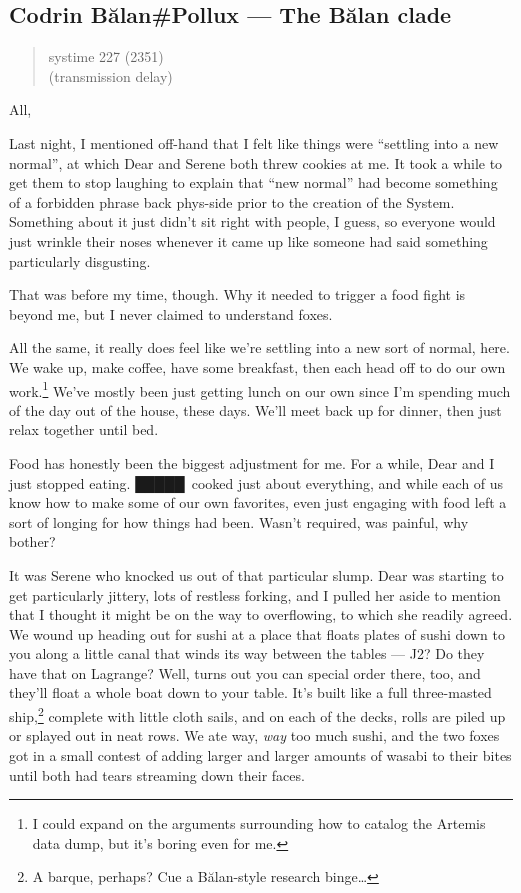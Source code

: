 \hypertarget{codrin-bux103lanpollux-the-bux103lan-clade}{%
\subsection{Codrin Bălan\#Pollux — The Bălan clade}\label{codrin-bux103lanpollux-the-bux103lan-clade}}

\begin{quote}
systime 227 (2351)\\
(transmission delay)
\end{quote}

All,

Last night, I mentioned off-hand that I felt like things were ``settling into a new normal'', at which Dear and Serene both threw cookies at me. It took a while to get them to stop laughing to explain that ``new normal'' had become something of a forbidden phrase back phys-side prior to the creation of the System. Something about it just didn't sit right with people, I guess, so everyone would just wrinkle their noses whenever it came up like someone had said something particularly disgusting.

That was before my time, though. Why it needed to trigger a food fight is beyond me, but I never claimed to understand foxes.

All the same, it really does feel like we're settling into a new sort of normal, here. We wake up, make coffee, have some breakfast, then each head off to do our own work.\footnote{I could expand on the arguments surrounding how to catalog the Artemis data dump, but it's boring even for me.} We've mostly been just getting lunch on our own since I'm spending much of the day out of the house, these days. We'll meet back up for dinner, then just relax together until bed.

Food has honestly been the biggest adjustment for me. For a while, Dear and I just stopped eating. █████\ cooked just about everything, and while each of us know how to make some of our own favorites, even just engaging with food left a sort of longing for how things had been. Wasn't required, was painful, why bother?

It was Serene who knocked us out of that particular slump. Dear was starting to get particularly jittery, lots of restless forking, and I pulled her aside to mention that I thought it might be on the way to overflowing, to which she readily agreed. We wound up heading out for sushi at a place that floats plates of sushi down to you along a little canal that winds its way between the tables — J2? Do they have that on Lagrange? Well, turns out you can special order there, too, and they'll float a whole boat down to your table. It's built like a full three-masted ship,\footnote{A barque, perhaps? Cue a Bălan-style research binge\ldots{}} complete with little cloth sails, and on each of the decks, rolls are piled up or splayed out in neat rows. We ate way, \emph{way} too much sushi, and the two foxes got in a small contest of adding larger and larger amounts of wasabi to their bites until both had tears streaming down their faces.

